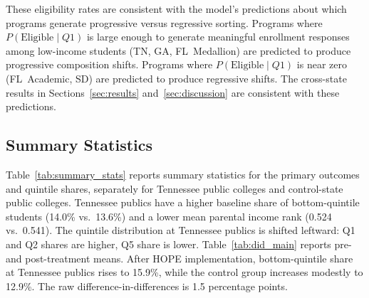 \noindent These eligibility rates are consistent with the model's
predictions about which programs generate progressive versus regressive
sorting. Programs where $P(\text{Eligible} \mid Q1)$
is large enough to generate meaningful enrollment responses among
low-income students (TN, GA, FL~Medallion) are predicted to produce
progressive composition shifts. Programs where $P(\text{Eligible}
\mid Q1)$ is near zero (FL~Academic, SD) are predicted to produce
regressive shifts. The cross-state results in Sections~\ref{sec:results}
and~\ref{sec:discussion} are consistent with these predictions.

\subsection{Summary Statistics}

Table~\ref{tab:summary_stats} reports summary statistics for the primary
outcomes and quintile shares, separately for Tennessee public colleges
and control-state public colleges. Tennessee publics have a higher baseline share of bottom-quintile
students (14.0\% vs.\ 13.6\%) and a lower mean parental income rank
(0.524 vs.\ 0.541). The quintile
distribution at Tennessee publics is shifted leftward: Q1 and Q2 shares
are higher, Q5 share is lower. Table~\ref{tab:did_main} reports pre-
and post-treatment means. After HOPE implementation, bottom-quintile
share at Tennessee publics rises to 15.9\%, while the control group
increases modestly to 12.9\%. The raw difference-in-differences is 1.5
percentage points.

